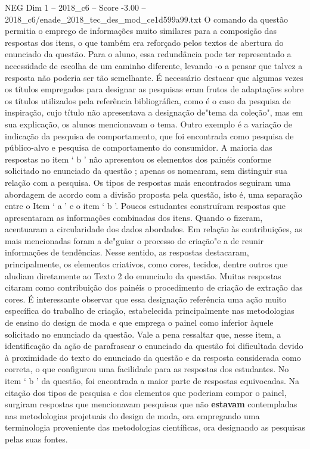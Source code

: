 \begin{textsample}{NEG Dim 1 – 2018\_c6 – Score -3.00 – 2018\_c6/enade\_2018\_tec\_des\_mod\_ce1d599a99.txt}
O comando da questão permitia o emprego de informações muito similares para a composição das respostas dos itens, o que também era reforçado pelos textos de abertura do enunciado da questão.
Para o aluno, essa redundância pode ter representado a necessidade de escolha de um caminho diferente, levando -o a pensar que talvez a resposta não poderia ser tão semelhante.
É necessário destacar que algumas vezes os títulos empregados para designar as pesquisas eram frutos de adaptações sobre os títulos utilizados pela referência bibliográfica, como é o caso da pesquisa de inspiração, cujo título não apresentava a designação de"tema da coleção", mas em sua explicação, os alunos mencionavam o tema.
Outro exemplo é a variação de indicação da pesquisa de comportamento, que foi encontrada como pesquisa de público-alvo e pesquisa de comportamento do consumidor.
A maioria das respostas no item ‘ b ’ não apresentou os elementos dos painéis conforme solicitado no enunciado da questão ; apenas os nomearam, sem distinguir sua relação com a pesquisa.
Os tipos de respostas mais encontrados seguiram uma abordagem de acordo com a divisão proposta pela questão, isto é, uma separação entre o Item ‘ a ’ e o item ‘ b ’.
Poucos estudantes construíram respostas que apresentaram as informações combinadas dos itens.
Quando o fizeram, acentuaram a circularidade dos dados abordados.
Em relação às contribuições, as mais mencionadas foram a de"guiar o processo de criação"e a de reunir informações de tendências.
Nesse sentido, as respostas destacaram, principalmente, os elementos criativos, como cores, tecidos, dentre outros que aludiam diretamente ao Texto 2 do enunciado da questão.
Muitas respostas citaram como contribuição dos painéis o procedimento de criação de extração das cores.
É interessante observar que essa designação referência uma ação muito específica do trabalho de criação, estabelecida principalmente nas metodologias de ensino do design de moda e que emprega o painel como inferior àquele solicitado no enunciado da questão.
Vale a pena ressaltar que, nesse item, a identificação da ação de parafrasear o enunciado da questão foi dificultada devido à proximidade do texto do enunciado da questão e da resposta considerada como correta, o que configurou uma facilidade para as respostas dos estudantes.
No item ‘ b ’ da questão, foi encontrada a maior parte de respostas equivocadas.
Na citação dos tipos de pesquisa e dos elementos que poderiam compor o painel, surgiram respostas que mencionavam pesquisas que não \textbf{estavam} contempladas nas metodologias projetuais do design de moda, ora empregando uma terminologia proveniente das metodologias científicas, ora designando as pesquisas pelas suas fontes.

\end{textsample}
